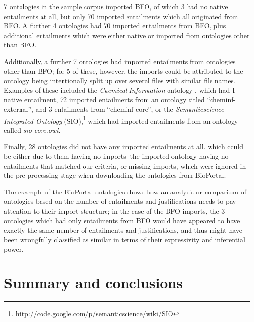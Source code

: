 7 ontologies in the sample corpus imported BFO, of which 3 had no native entailments at all, but only 70 imported entailments which all originated from BFO. A further 4 ontologies had 70 imported entailments from BFO, plus additional entailments which were either native or imported from ontologies other than BFO. 

Additionally, a further 7 ontologies had imported entailments from ontologies other than BFO; for 5 of these, however, the imports could be attributed to the ontology being intentionally split up over several files with similar file names. Examples of these included the \emph{Chemical Information} ontology \cite{konyk2008aa}, which had 1 native entailment, 72 imported entailments from an ontology titled \enquote{cheminf-external}, and 3 entailments from \enquote{cheminf-core},  or the \emph{Semanticscience Integrated Ontology} (SIO),\footnote{\url{http://code.google.com/p/semanticscience/wiki/SIO}} which had imported entailments from an ontology called \emph{sio-core.owl}. 

Finally, 28 ontologies did not have any imported entailments at all, which could be either due to them having no imports, the imported ontology having no entailments that matched our criteria, or missing imports, which were ignored in the pre-processing stage when downloading the ontologies from BioPortal.

The example of the BioPortal ontologies shows how an analysis or comparison of ontologies based on the number of entailments and justifications needs to pay attention to their import structure; in the case of the BFO imports, the 3 ontologies which had only entailments from BFO would have appeared to have exactly the same number of entailments and justifications,  and thus might have been wrongfully classified as similar in terms of their expressivity and inferential power.


\section{Summary and conclusions}

